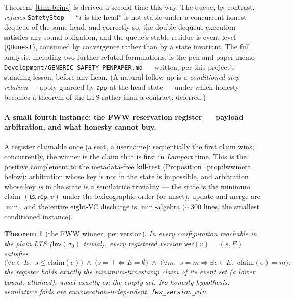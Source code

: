 \documentclass[11pt]{article}
\newtheorem{theorem}{Theorem}[section]
\newcommand{\Sinit}{\sigma_0}
\newcommand{\lean}[1]{\texttt{#1}}
\newcommand{\Inv}{\mathsf{Inv}}
\newcommand{\app}{\mathsf{app}}
\begin{document}
Theorem~\ref{thm:bcinv} is derived a second time this way. The queue,
by contrast, \emph{refuses} \lean{SafetyStep} --- ``$t$ is the head'' is
not stable under a concurrent honest dequeue of the same head, and
correctly so: the double-dequeue execution satisfies any sound
obligation, and the queue's stable residue is event-level
(\lean{QHonest}), consumed by convergence rather than by a state
invariant. The full analysis, including two further refuted
formulations, is the pen-and-paper memo
\lean{Development/GENERIC\_SAFETY\_PENPAPER.md} --- written, per this
project's standing lesson, before any Lean. (A natural follow-up is a
\emph{conditioned step relation} --- apply guarded by $\app$ at the head
state --- under which honesty becomes a theorem of the LTS rather than a
contract; deferred.)

\paragraph{A small fourth instance: the FWW reservation register --- payload
arbitration, and what honesty cannot buy.} A register claimable once (a
seat, a username): sequentially the first claim wins; concurrently, the
winner is the claim that is first in \emph{Lamport} time. This is the
positive complement to the metadata-free kill-test
(Proposition~\ref{prop:lwwmeta} below): arbitration whose key is not in the
state is impossible, and arbitration whose key \emph{is} in the state is a
semilattice triviality --- the state is the minimum claim
$(\mathsf{ts}, \mathsf{rep}, v)$ under the lexicographic order (or unset),
update and merge are $\min$, and the entire eight-VC discharge is
$\min$-algebra (${\sim}300$ lines, the smallest conditioned instance).

\begin{theorem}[the FWW winner, per version]
\label{thm:fww}
In every configuration reachable in the plain LTS ($\Inv(\Sinit)$ trivial), every
registered version $\mathsf{ver}(v) = (s, E)$ satisfies
\[
  \bigl(\forall e \in E.\;\; s \le \mathrm{claim}(e)\bigr)
  \;\wedge\; \bigl(s = \top \Leftrightarrow E = \emptyset\bigr)
  \;\wedge\; \bigl(\forall m.\;\; s = m \Rightarrow \exists e \in E.\;\;
  \mathrm{claim}(e) = m\bigr):
\]
the register holds exactly the minimum-timestamp claim of its event set (a lower
bound, attained), unset exactly on the empty set. No honesty hypothesis: semilattice
folds are enumeration-independent.
\hfill\lean{fww\_version\_min}
\end{theorem}
\end{document}
